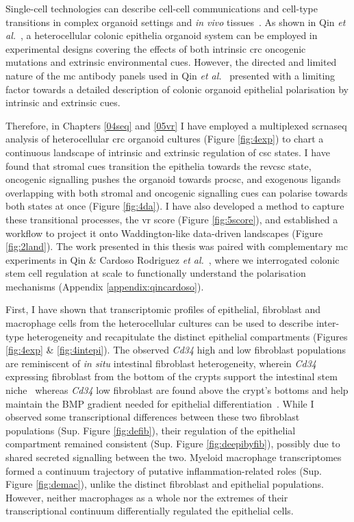 Single-cell technologies can describe cell-cell communications and cell-type transitions in complex organoid settings and \emph{in vivo} tissues~\cite{qin_deciphering_2020, jin_inference_2021, bues_deterministic_2022}. As shown in Qin \emph{et al.}~\cite{qin_cell-type-specific_2020}, a heterocellular colonic epithelia organoid system can be employed in experimental designs covering the effects of both intrinsic \acrshort{crc} oncogenic mutations and extrinsic environmental cues. However, the directed and limited nature of the \acrshort{mc} antibody panels used in Qin \emph{et al.}~\cite{qin_cell-type-specific_2020} presented with a limiting factor towards a detailed description of colonic organoid epithelial polarisation by intrinsic and extrinsic cues. 

Therefore, in Chapters \ref{04seq} and \ref{05vr} I have employed a multiplexed \acrshort{scrnaseq} analysis of heterocellular \acrshort{crc} organoid cultures (Figure \ref{fig:4exp}) to chart a continuous landscape of intrinsic and extrinsic regulation of \acrshort{csc} states. I have found that stromal cues transition the epithelia towards the \acrshort{revcsc} state, oncogenic signalling pushes the organoid towards \acrshort{procsc}, and exogenous ligands overlapping with both stromal and oncogenic signalling cues can polarise towards both states at once (Figure \ref{fig:4da}). I have also developed a method to capture these transitional processes, the \acrfull{vr} score (Figure \ref{fig:5score}), and established a workflow to project it onto Waddington-like data-driven landscapes (Figure \ref{fig:2land}). 
The work presented in this thesis was paired with complementary \acrshort{mc} experiments in Qin \& Cardoso Rodriguez \emph{et al.}~\cite{cardoso_rodriguez_single-cell_2023}, where we interrogated colonic stem cell regulation at scale to functionally understand the polarisation mechanisms (Appendix \ref{appendix:qincardoso}).

First, I have shown that transcriptomic profiles of epithelial, fibroblast and macrophage cells from the heterocellular cultures can be used to describe inter-type heterogeneity and recapitulate the distinct epithelial compartments (Figures \ref{fig:4exp} \& \ref{fig:4intepi}). 
The observed \emph{Cd34} high and low fibroblast populations are reminiscent of \emph{in situ} intestinal fibroblast heterogeneity, wherein \emph{Cd34} expressing fibroblast from the bottom of the crypts support the intestinal stem niche~\cite{stzepourginski_cd34_2017} whereas \emph{Cd34} low fibroblast are found above the crypt's bottoms and help maintain the BMP gradient needed for epithelial differentiation~\cite{karpus_colonic_2019}. While I observed some transcriptional differences between these two fibroblast populations (Sup. Figure \ref{fig:defib}), their regulation of the epithelial compartment remained consistent (Sup. Figure \ref{fig:deepibyfib}), possibly due to shared secreted signalling between the two. 
Myeloid macrophage transcriptomes formed a continuum trajectory of putative inflammation-related roles (Sup. Figure \ref{fig:demac}), unlike the distinct fibroblast and epithelial populations. However, neither macrophages as a whole nor the extremes of their transcriptional continuum differentially regulated the epithelial cells.

